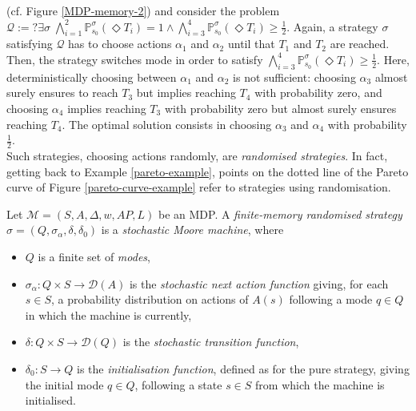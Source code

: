 (cf. Figure \ref{MDP-memory-2}) and consider the \MOSR{} problem
$\mathcal{Q}:= ?\exists \sigma \; \bigwedge_{i=1}^2 \mathbb{P}^\sigma_{s_0}(\Diamond T_i) = 1 \wedge \bigwedge_{i=3}^4 \mathbb{P}^\sigma_{s_0} (\Diamond T_i) \geq \frac{1}{2}$.
Again, a strategy $\sigma$ satisfying $\mathcal{Q}$ has to
choose actions $\alpha_1$ and $\alpha_2$ until that $T_1$ and $T_2$ are reached.
Then, the strategy switches mode in order to satisfy $\bigwedge_{i=3}^4 \mathbb{P}^\sigma_{s_0} (\Diamond T_i) \geq \frac{1}{2}$. Here, deterministically choosing between $\alpha_1$ and $\alpha_2$ is not sufficient: choosing $\alpha_3$ almost surely ensures to reach $T_3$ but implies reaching $T_4$ with probability zero,
and choosing $\alpha_4$ implies reaching $T_3$ with probability zero but almost surely ensures reaching $T_4$.
The optimal solution consists in choosing $\alpha_3$ and $\alpha_4$ with probability $\frac{1}{2}$.\\

Such strategies, choosing actions randomly, are \textit{randomised strategies}.
In fact, getting back to Example \ref{pareto-example}, points on the dotted line of the Pareto curve of Figure \ref{pareto-curve-example} refer to strategies using randomisation.

\begin{definition}
  Let \sloppy $\mathcal{M}={(S, A, \Delta, w, AP, L)}$ be an MDP. A \textit{finite-memory randomised strategy} $\sigma = (Q, \sigma_\alpha, \delta, \delta_0)$ is a \textit{stochastic Moore machine}, where
  \begin{itemize}
    \item $Q$ is a finite set of \textit{modes},
    \item $\sigma_\alpha: Q \times S \rightarrow \mathcal{D}(A)$ is the \textit{stochastic next action function} giving, for each $s \in S$, a probability distribution on actions of $A(s)$ following a mode $q \in Q$ in which the machine is currently,
    \item $\delta: Q \times S \rightarrow \mathcal{D}(Q)$ is the \textit{stochastic transition function},
    \item $\delta_0: S \rightarrow Q$ is the \textit{initialisation function}, defined as for the pure strategy, giving the initial mode $q \in Q$, following a state $s \in S$ from which the machine is initialised.
  \end{itemize}
\end{definition}

